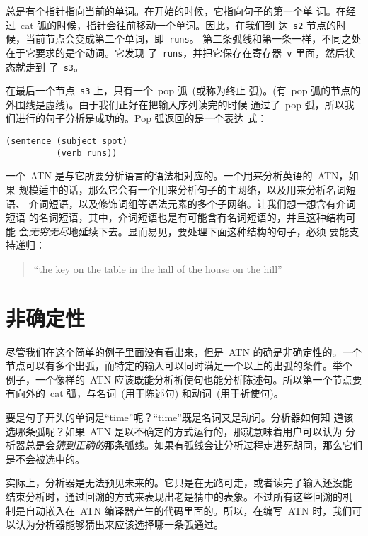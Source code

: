 总是有个指针指向当前的单词。在开始的时候，它指向句子的第一个单
词。在经过~cat 弧的时候，指针会往前移动一个单词。因此，在我们到
达~\texttt{s2} 节点的时候，当前节点会变成第二个单词，即~\texttt{runs}。
第二条弧线和第一条一样，不同之处在于它要求的是个动词。它发现
了~\texttt{runs}，并把它保存在寄存器~\texttt{v} 里面，然后状态就走到
了~\texttt{s3}。

在最后一个节点~\texttt{s3} 上，只有一个~pop 弧~(或称为终止
弧)。(有~pop 弧的节点的外围线是虚线)。由于我们正好在把输入序列读完的时候
通过了~pop 弧，所以我们进行的句子分析是成功的。Pop 弧返回的是一个\bq{}表达
式：

\begin{lstlisting}
(sentence (subject spot)
          (verb runs))
\end{lstlisting}

一个~\textsc{ATN} 是与它所要分析语言的语法相对应的。一个用来分析英语的~\textsc{ATN}，如果
规模适中的话，那么它会有一个用来分析句子的主网络，以及用来分析名词短语、
介词短语，以及修饰词组等语法元素的多个子网络。让我们想一想含有介词短语
的名词短语，其中，介词短语也是有可能含有名词短语的，并且这种结构可能
会\emph{无穷无尽}地延续下去。显而易见，要处理下面这种结构的句子，必须
要能支持递归：

\begin{quote} 
  ``the key on the table in the hall of the house on the hill''
\end{quote}

\section{非确定性}
\label{sec:nondeterminism}

尽管我们在这个简单的例子里面没有看出来，但是~\textsc{ATN} 的确是非确定性的。一个
节点可以有多个出弧，而特定的输入可以同时满足一个以上的出弧的条件。举个
例子，一个像样的~\textsc{ATN} 应该既能分析祈使句也能分析陈述句。所以第一个节点要
有向外的~cat 弧，与名词~(用于陈述句) 和动词~(用于祈使句)。

要是句子开头的单词是``time''呢？``time''既是名词又是动词。分析器如何知
道该选哪条弧呢？如果~\textsc{ATN} 是以不确定的方式运行的，那就意味着用户可以认为
分析器总是会\emph{猜到正确的}那条弧线。如果有弧线会让分析过程走进死胡同，那么它们
是不会被选中的。

实际上，分析器是无法预见未来的。它只是在无路可走，或者读完了输入还没能
结束分析时，通过回溯的方式来表现出老是猜中的表象。不过所有这些回溯的机
制是自动嵌入在~\textsc{ATN} 编译器产生的代码里面的。所以，在编写~\textsc{ATN} 时，我们可
以认为分析器能够猜出来应该选择哪一条弧通过。

